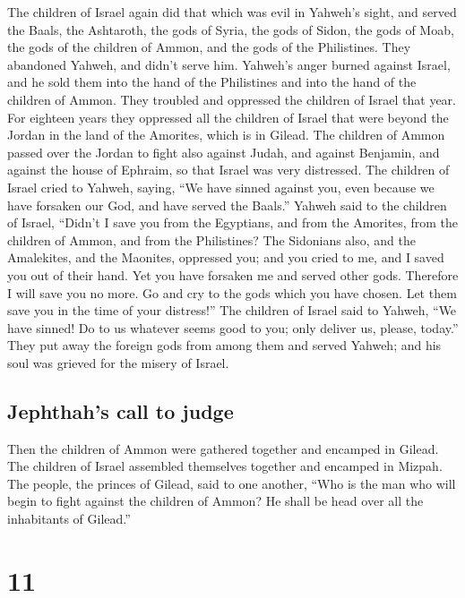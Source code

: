  The children of Israel again did that which was evil in
Yahweh's sight, and served the Baals, the Ashtaroth, the gods of Syria,
the gods of Sidon, the gods of Moab, the gods of the children of Ammon,
and the gods of the Philistines. They abandoned Yahweh, and didn't serve
him.  Yahweh's anger burned against Israel, and he sold
them into the hand of the Philistines and into the hand of the children
of Ammon.  They troubled and oppressed the children of
Israel that year. For eighteen years they oppressed all the children of
Israel that were beyond the Jordan in the land of the Amorites, which is
in Gilead.  The children of Ammon passed over the Jordan
to fight also against Judah, and against Benjamin, and against the house
of Ephraim, so that Israel was very distressed.  The
children of Israel cried to Yahweh, saying, ``We have sinned against
you, even because we have forsaken our God, and have served the Baals.''
 Yahweh said to the children of Israel, ``Didn't I save
you from the Egyptians, and from the Amorites, from the children of
Ammon, and from the Philistines?  The Sidonians also, and
the Amalekites, and the Maonites, oppressed you; and you cried to me,
and I saved you out of their hand.  Yet you have forsaken
me and served other gods. Therefore I will save you no more.
 Go and cry to the gods which you have chosen. Let them
save you in the time of your distress!''  The children of
Israel said to Yahweh, ``We have sinned! Do to us whatever seems good to
you; only deliver us, please, today.''  They put away the
foreign gods from among them and served Yahweh; and his soul was grieved
for the misery of Israel.

\hypertarget{jephthahs-call-to-judge}{%
\subsection{Jephthah's call to judge}\label{jephthahs-call-to-judge}}

 Then the children of Ammon were gathered together and
encamped in Gilead. The children of Israel assembled themselves together
and encamped in Mizpah.  The people, the princes of
Gilead, said to one another, ``Who is the man who will begin to fight
against the children of Ammon? He shall be head over all the inhabitants
of Gilead.''

\hypertarget{section-10}{%
\section{11}\label{section-10}}

